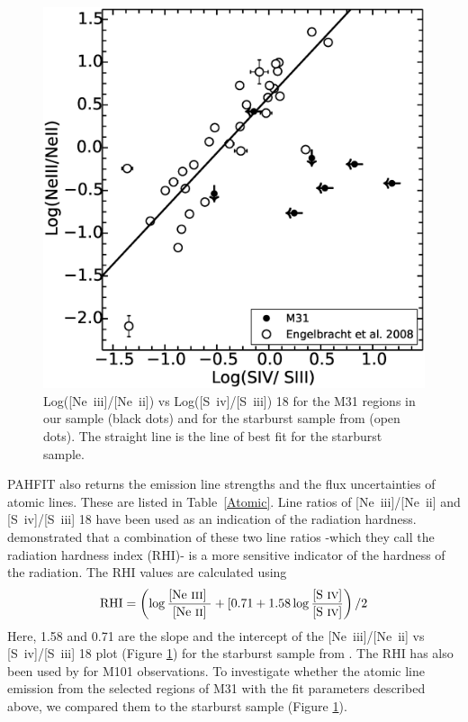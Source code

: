 \begin{figure}
\centering
\includegraphics[scale=0.3]{./NevsS.eps}
\caption{ Log([Ne~{\sc iii}]/[Ne~{\sc ii}])  vs Log([S~{\sc iv}]/[S~{\sc iii}]) 18 for the M31 regions in our sample (black dots) and for the starburst sample from \citet{Engelbracht_2008} (open dots). The straight line is the line of best fit for the starburst sample.}
\label{SvsNe}
\end{figure}

PAHFIT also returns the emission line strengths and the flux uncertainties of atomic lines. These are listed in Table~\ref{Atomic}.
Line ratios of [Ne~{\sc iii}]/[Ne~{\sc ii}] and [S~{\sc iv}]/[S~{\sc iii}] 18 have been used as an indication of the radiation hardness. \citet{Engelbracht_2008} demonstrated that a combination of these two line ratios -which they call the radiation hardness index (RHI)- is a more sensitive indicator of the hardness of the radiation. The RHI values are calculated using
\begin{equation}
{\rm RHI} = \left( \log\frac{\textrm{[Ne~{\sc iii}] }}{\textrm{[Ne~{\sc ii}]}} + [0.71 + 1.58\log\frac{\textrm{{[S~{\sc iv}]}}}{\textrm{{[S~{\sc iv}]}}}\right) /2
\end{equation}
Here, 1.58 and 0.71 are the slope and the intercept of the [Ne~{\sc iii}]/[Ne~{\sc ii}]  vs [S~{\sc iv}]/[S~{\sc iii}] 18 plot (Figure \ref{SvsNe}) for the starburst sample from 
\citet{Engelbracht_2008}. The RHI has also been used by \citet{Gordon:2008lr} for M101 observations. To investigate whether the atomic line emission from the selected regions of M31 with the fit parameters described above, we compared them to the starburst sample (Figure \ref{SvsNe}). 
	
